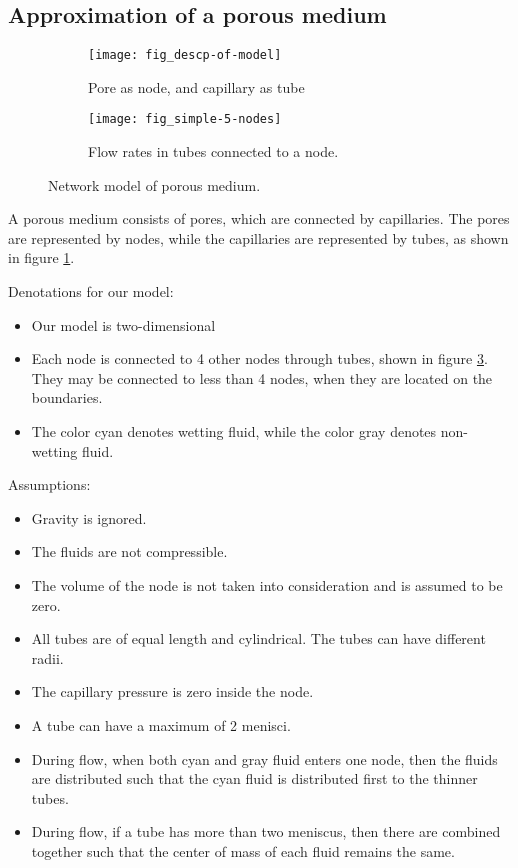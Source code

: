 \subsection{Approximation of a porous medium} \label{sec:approx-porous-medium}

	\begin{figure}[H]
		\centering
		\begin{subfigure}{0.55\textwidth}
			\centering
			\texttt{[image: fig\_descp-of-model]}
			\caption{Pore as node, and capillary as tube}
			\label{fig:descp-of-model}
		\end{subfigure}
		\begin{subfigure}{0.4\textwidth}
			\centering
			\texttt{[image: fig\_simple-5-nodes]}
			\caption{Flow rates in tubes connected to a node.}
			\label{fig:simple-5-nodes}
		\end{subfigure}
		\caption{Network model of porous medium.}
	\end{figure}
	
	A porous medium consists of pores, which are connected by capillaries. The pores are represented by nodes, while the capillaries are represented by tubes, as shown in figure \ref{fig:descp-of-model}.
	
	Denotations for our model:
	
	\begin{itemize}
		\item Our model is two-dimensional 
		\item Each node is connected to 4 other nodes through tubes, shown in figure \ref{fig:simple-5-nodes}. They may be connected to less than 4 nodes, when they are located on the boundaries.
		\item The color cyan denotes wetting fluid, while the color gray denotes non-wetting fluid.
	\end{itemize}
	
	Assumptions:
	
	\begin{itemize}
		\item Gravity is ignored.
		\item The fluids are not compressible.
		\item The volume of the node is not taken into consideration and is assumed to be zero.
		\item All tubes are of equal length and cylindrical. The tubes can have different radii.
		\item The capillary pressure is zero inside the node.
		\item A tube can have a maximum of 2 menisci.
		\item During flow, when both cyan and gray fluid enters one node, then the fluids are distributed such that the cyan fluid is distributed first to the thinner tubes.
		\item During flow, if a tube has more than two meniscus, then there are combined together such that the center of mass of each fluid remains the same.
	\end{itemize}
	
